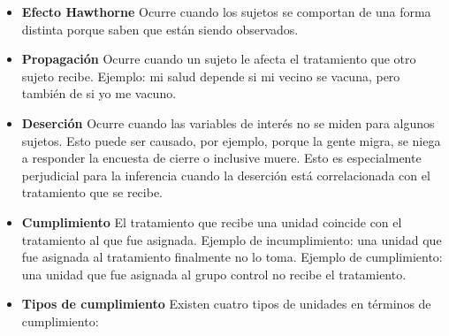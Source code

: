 \documentclass[12pt,spanish,]{book}
\providecommand{\tightlist}{%
  \setlength{\itemsep}{0pt}\setlength{\parskip}{0pt}}
\begin{document}
\begin{itemize}
\tightlist
\item
  \textbf{Efecto Hawthorne} Ocurre cuando los sujetos se comportan de una forma distinta porque saben que están siendo observados.
\item
  \textbf{Propagación} Ocurre cuando un sujeto le afecta el tratamiento que otro sujeto recibe.
  Ejemplo: mi salud depende si mi vecino se vacuna, pero también de si yo me vacuno.
\item
  \textbf{Deserción} Ocurre cuando las variables de interés no se miden para algunos sujetos. Esto puede ser causado, por ejemplo, porque la gente migra, se niega a responder la encuesta de cierre o inclusive muere. Esto es especialmente perjudicial para la inferencia cuando la deserción está correlacionada con el tratamiento que se recibe.
\item
  \textbf{Cumplimiento} El tratamiento que recibe una unidad coincide con el tratamiento al que fue asignada. Ejemplo de incumplimiento: una unidad que fue asignada al tratamiento finalmente no lo toma. Ejemplo de cumplimiento: una unidad que fue asignada al grupo control no recibe el tratamiento.
\item
  \textbf{Tipos de cumplimiento} Existen cuatro tipos de unidades en términos de cumplimiento:


\end{itemize}
\end{document}
